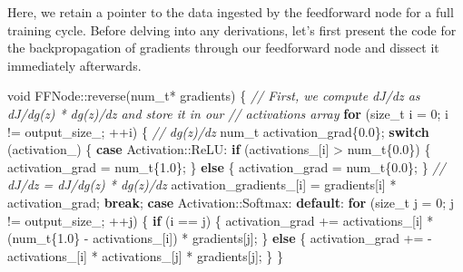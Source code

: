 \documentclass[
]{article}
\newenvironment{Shaded}{}{}
\newcommand{\CommentTok}[1]{\textcolor[rgb]{0.38,0.63,0.69}{\textit{#1}}}
\newcommand{\ControlFlowTok}[1]{\textcolor[rgb]{0.00,0.44,0.13}{\textbf{#1}}}
\newcommand{\DataTypeTok}[1]{\textcolor[rgb]{0.56,0.13,0.00}{#1}}
\newcommand{\DecValTok}[1]{\textcolor[rgb]{0.25,0.63,0.44}{#1}}
\newcommand{\FloatTok}[1]{\textcolor[rgb]{0.25,0.63,0.44}{#1}}
\newcommand{\NormalTok}[1]{#1}
\newcommand{\VariableTok}[1]{\textcolor[rgb]{0.10,0.09,0.49}{#1}}
\begin{document}
Here, we retain a pointer to the data ingested by the feedforward node
for a full training cycle. Before delving into any derivations, let's
first present the code for the backpropagation of gradients through our
feedforward node and dissect it immediately afterwards.

\begin{Shaded}
\begin{Highlighting}[]
\DataTypeTok{void}\NormalTok{ FFNode::reverse(}\DataTypeTok{num\_t}\NormalTok{* gradients)}
\NormalTok{\{}
    \CommentTok{// First, we compute dJ/dz as dJ/dg(z) * dg(z)/dz and store it in our}
    \CommentTok{// activations array}
    \ControlFlowTok{for}\NormalTok{ (}\DataTypeTok{size\_t}\NormalTok{ i = }\DecValTok{0}\NormalTok{; i != }\VariableTok{output\_size\_}\NormalTok{; ++i)}
\NormalTok{    \{}
        \CommentTok{// dg(z)/dz}
        \DataTypeTok{num\_t}\NormalTok{ activation\_grad\{}\FloatTok{0.0}\NormalTok{\};}
        \ControlFlowTok{switch}\NormalTok{ (}\VariableTok{activation\_}\NormalTok{)}
\NormalTok{        \{}
        \ControlFlowTok{case}\NormalTok{ Activation::ReLU:}
            \ControlFlowTok{if}\NormalTok{ (}\VariableTok{activations\_}\NormalTok{[i] \textgreater{} }\DataTypeTok{num\_t}\NormalTok{\{}\FloatTok{0.0}\NormalTok{\})}
\NormalTok{            \{}
\NormalTok{                activation\_grad = }\DataTypeTok{num\_t}\NormalTok{\{}\FloatTok{1.0}\NormalTok{\};}
\NormalTok{            \}}
            \ControlFlowTok{else}
\NormalTok{            \{}
\NormalTok{                activation\_grad = }\DataTypeTok{num\_t}\NormalTok{\{}\FloatTok{0.0}\NormalTok{\};}
\NormalTok{            \}}
            \CommentTok{// dJ/dz = dJ/dg(z) * dg(z)/dz}
            \VariableTok{activation\_gradients\_}\NormalTok{[i] = gradients[i] * activation\_grad;}
            \ControlFlowTok{break}\NormalTok{;}
        \ControlFlowTok{case}\NormalTok{ Activation::Softmax:}
        \ControlFlowTok{default}\NormalTok{:}
            \ControlFlowTok{for}\NormalTok{ (}\DataTypeTok{size\_t}\NormalTok{ j = }\DecValTok{0}\NormalTok{; j != }\VariableTok{output\_size\_}\NormalTok{; ++j)}
\NormalTok{            \{}
                \ControlFlowTok{if}\NormalTok{ (i == j)}
\NormalTok{                \{}
\NormalTok{                    activation\_grad += }\VariableTok{activations\_}\NormalTok{[i]}
\NormalTok{                                       * (}\DataTypeTok{num\_t}\NormalTok{\{}\FloatTok{1.0}\NormalTok{\} {-} }\VariableTok{activations\_}\NormalTok{[i])}
\NormalTok{                                       * gradients[j];}
\NormalTok{                \}}
                \ControlFlowTok{else}
\NormalTok{                \{}
\NormalTok{                    activation\_grad}
\NormalTok{                        += {-}}\VariableTok{activations\_}\NormalTok{[i] * }\VariableTok{activations\_}\NormalTok{[j] * gradients[j];}
\NormalTok{                \}}
\NormalTok{            \}}


\end{Highlighting}
\end{Shaded}
\end{document}
